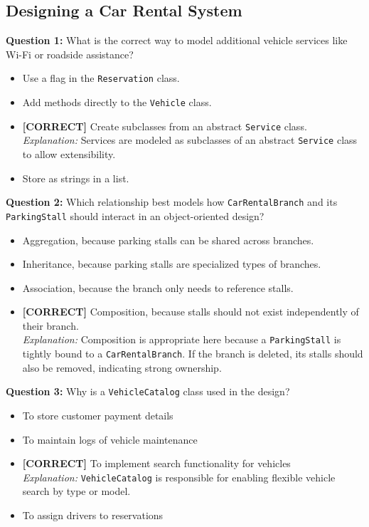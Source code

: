 \subsection*{Designing a Car Rental System}
\vspace{0.3cm}
\noindent
\textbf{Question 1:} What is the correct way to model additional vehicle services like Wi-Fi or roadside assistance?
\\[0.2cm]
\begin{itemize}
 \item Use a flag in the \texttt{Reservation} class.
 \item Add methods directly to the \texttt{Vehicle} class.
 \item \textbf{[CORRECT]} Create subclasses from an abstract \texttt{Service} class.
\\[0.1cm]
\textit{Explanation:} 
Services are modeled as subclasses of an abstract \texttt{Service} class to allow extensibility.
 \item Store as strings in a list.
\end{itemize}
\vspace{0.3cm}
\noindent
\textbf{Question 2:} Which relationship best models how \texttt{CarRentalBranch} and its \texttt{ParkingStall} should interact in an object-oriented design?
\\[0.2cm]
\begin{itemize}
 \item Aggregation, because parking stalls can be shared across branches.
 \item Inheritance, because parking stalls are specialized types of branches.
 \item Association, because the branch only needs to reference stalls.
 \item \textbf{[CORRECT]} Composition, because stalls should not exist independently of their branch.
\\[0.1cm]
\textit{Explanation:} 
Composition is appropriate here because a \texttt{ParkingStall} is tightly bound to a \texttt{CarRentalBranch}. If the branch is deleted, its stalls should also be removed, indicating strong ownership.
\end{itemize}
\vspace{0.3cm}
\noindent
\textbf{Question 3:} Why is a \texttt{VehicleCatalog} class used in the design?
\\[0.2cm]
\begin{itemize}
 \item To store customer payment details
 \item To maintain logs of vehicle maintenance
 \item \textbf{[CORRECT]} To implement search functionality for vehicles
\\[0.1cm]
\textit{Explanation:} 
\texttt{VehicleCatalog} is responsible for enabling flexible vehicle search by type or model.
 \item To assign drivers to reservations
\end{itemize}
